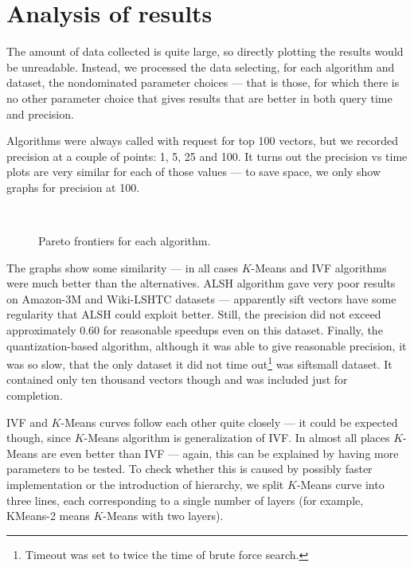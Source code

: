 \section{Analysis of results}

The amount of data collected is quite large, so directly plotting the results would be
unreadable. Instead, we processed the data selecting, for each algorithm and dataset,
the nondominated parameter choices --- that is those, for which there is no other
parameter choice that gives results that are better in both query time and precision.

Algorithms were always called with request for top 100 vectors, but we recorded
precision at a couple of points: 1, 5, 25 and 100. It turns out the precision vs time
plots are very similar for each of those values --- to save space, we only show
graphs for precision at 100.


\begin{figure}[H]
	\centering
	\\
\caption{Pareto frontiers for each algorithm.}
\end{figure}

The graphs show some similarity --- in all cases $K$-Means and IVF algorithms were much better
than the alternatives. ALSH algorithm gave very poor results on Amazon-3M and Wiki-LSHTC
datasets --- apparently sift vectors have some regularity that ALSH could exploit better.
Still, the precision did not exceed approximately $0.60$ for reasonable speedups even on
this dataset. Finally, the quantization-based algorithm, although it was able to give
reasonable precision, it was so slow, that the only dataset it did not time 
out\footnote{Timeout was set to twice the time of brute force search.}
was siftsmall dataset. It contained only ten thousand vectors though and was included
just for completion.

IVF and $K$-Means curves follow each other quite closely --- it could be expected though,
since $K$-Means algorithm is generalization of IVF. In almost all places $K$-Means are even
better than IVF --- again, this can be explained by having more parameters to be tested.
To check whether this is caused by possibly faster implementation or the introduction of
hierarchy, we split $K$-Means curve into three lines, each corresponding to a single
number of layers (for example, KMeans-2 means $K$-Means with two layers).

